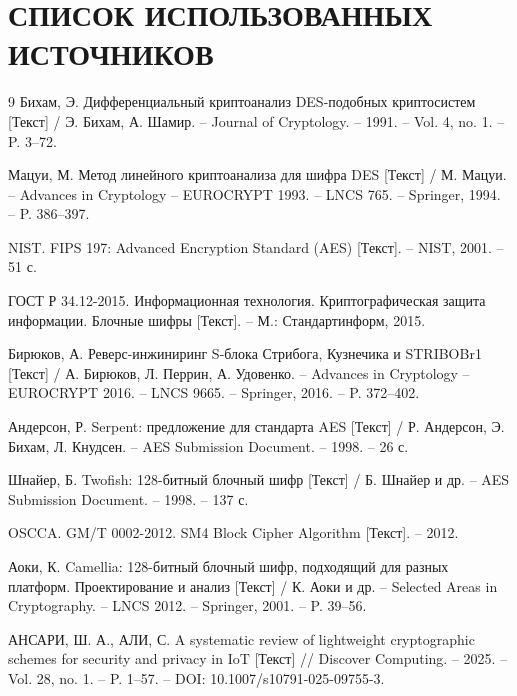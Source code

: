 \newpage
\section*{СПИСОК ИСПОЛЬЗОВАННЫХ ИСТОЧНИКОВ}
\renewcommand{\refname}{\vspace*{-3em}}  %

\begin{thebibliography}{9}
\renewcommand{\bibnumfmt}[1]{#1.}  %
Бихам, Э. Дифференциальный криптоанализ DES-подобных криптосистем [Текст] / Э. Бихам, А. Шамир. – Journal of Cryptology. – 1991. – Vol. 4, no. 1. – P. 3–72.

Мацуи, М. Метод линейного криптоанализа для шифра DES [Текст] / М. Мацуи. – Advances in Cryptology – EUROCRYPT 1993. – LNCS 765. – Springer, 1994. – P. 386–397.

NIST. FIPS 197: Advanced Encryption Standard (AES) [Текст]. – NIST, 2001. – 51 с.

ГОСТ Р 34.12-2015. Информационная технология. Криптографическая защита информации. Блочные шифры [Текст]. – М.: Стандартинформ, 2015.

Бирюков, А. Реверс-инжиниринг S-блока Стрибога, Кузнечика и STRIBOBr1 [Текст] / А. Бирюков, Л. Перрин, А. Удовенко. – Advances in Cryptology – EUROCRYPT 2016. – LNCS 9665. – Springer, 2016. – P. 372–402.

Андерсон, Р. Serpent: предложение для стандарта AES [Текст] / Р. Андерсон, Э. Бихам, Л. Кнудсен. – AES Submission Document. – 1998. – 26 с.

Шнайер, Б. Twofish: 128-битный блочный шифр [Текст] / Б. Шнайер и др. – AES Submission Document. – 1998. – 137 с.

OSCCA. GM/T 0002-2012. SM4 Block Cipher Algorithm [Текст]. – 2012.

Аоки, К. Camellia: 128-битный блочный шифр, подходящий для разных платформ. Проектирование и анализ [Текст] / К. Аоки и др. – Selected Areas in Cryptography. – LNCS 2012. – Springer, 2001. – P. 39–56.

АНСАРИ, Ш. А., АЛИ, С. A systematic review of lightweight cryptographic schemes for security and privacy in IoT [Текст] // Discover Computing. – 2025. – Vol. 28, no. 1. – P. 1–57. – DOI: 10.1007/s10791-025-09755-3.


\end{thebibliography}
